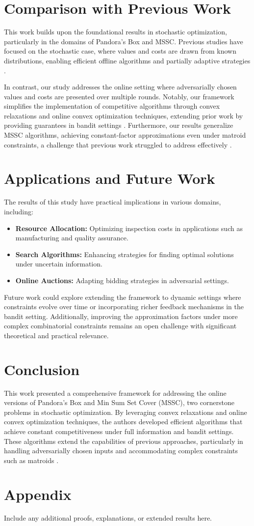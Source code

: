 \documentclass[11pt,a4paper]{article}
\begin{document}
\section{Comparison with Previous Work}
This work builds upon the foundational results in stochastic optimization, particularly in the domains of Pandora’s Box and MSSC. Previous studies have focused on the stochastic case, where values and costs are drawn from known distributions, enabling efficient offline algorithms and partially adaptive strategies \cite{weitzman1978optimal, chawla2020pandora}.

In contrast, our study addresses the online setting where adversarially chosen values and costs are presented over multiple rounds. Notably, our framework simplifies the implementation of competitive algorithms through convex relaxations and online convex optimization techniques, extending prior work by providing guarantees in bandit settings \cite{gergatsouli2022online}. Furthermore, our results generalize MSSC algorithms, achieving constant-factor approximations even under matroid constraints, a challenge that previous work struggled to address effectively \cite{feige2004approximating}.

\section{Applications and Future Work}
The results of this study have practical implications in various domains, including:
\begin{itemize}
    \item \textbf{Resource Allocation:} Optimizing inspection costs in applications such as manufacturing and quality assurance.
    \item \textbf{Search Algorithms:} Enhancing strategies for finding optimal solutions under uncertain information.
    \item \textbf{Online Auctions:} Adapting bidding strategies in adversarial settings.
\end{itemize}

Future work could explore extending the framework to dynamic settings where constraints evolve over time or incorporating richer feedback mechanisms in the bandit setting. Additionally, improving the approximation factors under more complex combinatorial constraints remains an open challenge with significant theoretical and practical relevance.
\pagebreak

\section{Conclusion}
This work presented a comprehensive framework for addressing the online versions of Pandora’s Box and Min Sum Set Cover (MSSC), two cornerstone problems in stochastic optimization. By leveraging convex relaxations and online convex optimization techniques, the authors developed efficient algorithms that achieve constant competitiveness under full information and bandit settings. These algorithms extend the capabilities of previous approaches, particularly in handling adversarially chosen inputs and accommodating complex constraints such as matroids \cite{gergatsouli2022online}.

\appendix
\section{Appendix}
Include any additional proofs, explanations, or extended results here.



\end{document}
